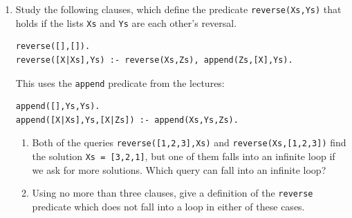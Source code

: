 \documentclass{article}
\begin{document}
\begin{enumerate}
\item
Study the following clauses, which define the predicate
\verb!reverse(Xs,Ys)! that holds if the lists \verb!Xs! and
\verb!Ys! are each other's reversal.  
\begin{verbatim}
reverse([],[]).
reverse([X|Xs],Ys) :- reverse(Xs,Zs), append(Zs,[X],Ys).
\end{verbatim}
This uses the \verb!append! predicate from the lectures:
\begin{verbatim}
append([],Ys,Ys).
append([X|Xs],Ys,[X|Zs]) :- append(Xs,Ys,Zs).
\end{verbatim}
\begin{enumerate}
\item
Both of the queries \verb!reverse([1,2,3],Xs)! and
\verb!reverse(Xs,[1,2,3])! find the solution \verb!Xs = [3,2,1]!, but
one of them falls into an infinite loop if we ask for more
solutions. Which query can fall into an infinite loop?
\item
Using no more than three clauses, give a definition of the
\verb!reverse! predicate which does not fall into a loop in either of
these cases.
\end{enumerate}

\end{enumerate}
\end{document}
